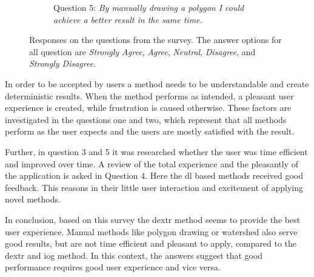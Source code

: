 \begin{figure}
\begin{subfigure}[t]{0.48\textwidth}
		\caption{
			Question 5: \textit{By manually drawing a polygon I could achieve a better result in the same time.}
		} \label{fig:ch5:sec4:q5}
	\end{subfigure}
	\caption [Watershed User Interaction]{
		Responses on the questions from the survey.
		The answer options for all question are \textit{Strongly Agree}, \textit{Agree}, \textit{Neutral}, \textit{Disagree}, and \textit{Strongly Disagree}.
	} \label{fig:ch5:sec4:suvery}
\end{figure}

In order to be accepted by users a method needs to be understandable and create deterministic results.
When the method performs as intended, a pleasant user experience is created, while frustration is caused otherwise.
These factors are investigated in the questions one and two, which represent that all methods perform as the user expects and the users are mostly satisfied with the result.

Further, in question 3 and 5 it was researched whether the user was time efficient and improved over time.
A review of the total experience and the pleasantly of the application is asked in Question 4.
Here the \gls{dl} based methods received good feedback.
This reasons in their little user interaction and excitement of applying novel methods.

In conclusion, based on this survey the \gls{dextr} method seems to provide the best user experience.
Manual methods like polygon drawing or watershed also serve good results, but are not time efficient and pleasant to apply, compared to the \gls{dextr} and \gls{iog} method.
In this context, the answers suggest that good performance requires good user experience and vice versa.

